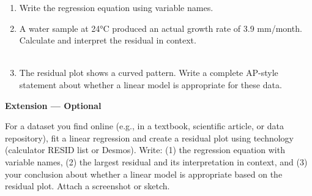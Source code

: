 \documentclass[10pt]{article}
\begin{document}
\begin{enumerate}[label=\textbf{(\alph*)}, leftmargin=2em, itemsep=0.18in]

  \item Write the regression equation using variable names.\\[8pt]

  \item A water sample at 24°C produced an actual growth rate of 3.9 mm/month. Calculate
        and interpret the residual in context.\\[8pt]
        \\[3pt]

  \item The residual plot shows a curved pattern. Write a complete AP-style statement about
        whether a linear model is appropriate for these data.\\[8pt]

\end{enumerate}

\vspace{0.18in}

\begin{extensionbox}
\small\textbf{Extension --- Optional}

For a dataset you find online (e.g., in a textbook, scientific article, or data repository),
fit a linear regression and create a residual plot using technology (calculator RESID list
or Desmos). Write: (1) the regression equation with variable names, (2) the largest
residual and its interpretation in context, and (3) your conclusion about whether a linear
model is appropriate based on the residual plot. Attach a screenshot or sketch.
\end{extensionbox}

\vspace{0.16in}
\end{document}
